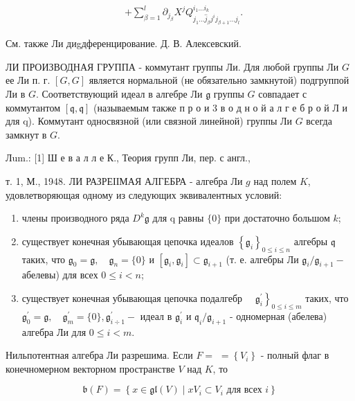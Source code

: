 \documentclass[10pt]{article}
\begin{document}
\[

\begin{aligned}

& +\sum_{\beta=1}^{l} \partial_{j_{\beta}} X^{j} Q_{j_{1} \ldots \hat{j}_{\beta} j^{i} j_{\beta+1} \ldots j_{l}}^{i_{1} \ldots i_{k}} .

\end{aligned}

\]



См. также Ли диgдференцирование. Д. В. Алексевский.



ЛИ ПРОИЗВОДНАЯ ГРУППА - коммутант группы Ли. Для любой группы Ли $G$ ее Ли п. г. $[G, G]$ является нормальной (не обязательно замкнутой) подгруппой Ли в $G$. Соответствующий идеал в алгебре Ли $\mathfrak{g}$ группы $G$ совпадает с коммутантом $[\mathfrak{q}, \mathfrak{q}]$ (называемым также п р о и 3 в о д н о й а л г е б р о й Л и для q). Коммутант односвязной (или связной линейной) группы Ли $G$ всегда замкнут в $G$.



Лum.: [1] Ш е в а л л е К., Теория групп Ли, пер. с англ.,

т. 1, М., 1948. ЛИ РАЗРЕІІМАЯ АЛГЕБРА - алгебра Ли $g$ над полем $K$, удовлетворяющая одному из следующих эквивалентных условий:



\begin{enumerate}

  \item члены производного ряда $D^{k} \mathfrak{g}$ для q равны $\{0\}$ при достаточно большом $k$;



  \item существует конечная убывающая цепочка идеалов $\left\{\mathfrak{g}_{i}\right\}_{0 \leqslant i \leqslant n}$ алгебры $\mathfrak{q}$ таких, что $\mathfrak{g}_{0}=\mathfrak{g}, \quad \mathfrak{g}_{n}=\{0\}$ и $\left[\mathfrak{g}_{i}, \mathfrak{g}_{i}\right] \subset \mathfrak{g}_{i+1}$ (т. е. алгебры Ли $\mathfrak{g}_{i} / \mathfrak{g}_{i+1}-$ абелевы) для всех $0 \leqslant i<n$;



  \item существует конечная убывающая цепочка подалгебр $\left.\quad \mathfrak{g}_{i}^{\prime}\right\}_{0 \leqslant i \leqslant m}$ таких, что $\mathfrak{g}_{0}^{\prime}=\mathfrak{g}, \quad \mathfrak{g}_{m}^{\prime}=\{0\}, \mathfrak{g}_{i \div 1}^{\prime}-$ идеал в $\mathfrak{g}_{i}^{\prime}$ и $\mathfrak{q}_{i} / \mathfrak{g}_{i+1}$ - одномерная (абелева) алгебра Ли для $0 \leqslant i<m$.



\end{enumerate}



Нильпотентная алгебра Ли разрешима. Если $F=$ $=\left\{V_{i}\right\}$ - полный флаг в конечномерном векторном пространстве $V$ над $K$, то



\[

\mathfrak{b}(F)=\left\{x \in \mathfrak{g l}(V) \mid x V_{i} \subset V_{i} \text { для всех } i\right\}

\]
\end{document}
